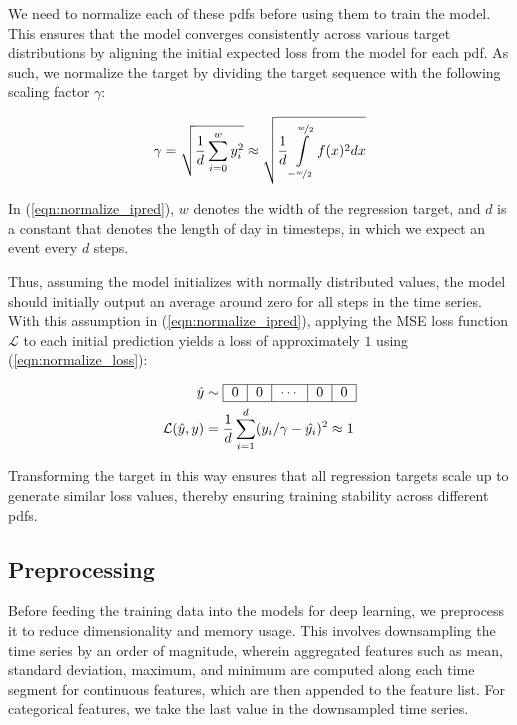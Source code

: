 \documentclass{article}
\begin{document}
We need to normalize each of these pdfs before using them to train the model. This ensures that the model converges consistently across various target distributions by aligning the initial expected loss from the model for each pdf. As such, we normalize the target by dividing the target sequence with the following scaling factor $\gamma$:

\begin{align} \label{eqn:normalize}
\displaystyle \gamma = \sqrt{\dfrac{1}{d}\sum\limits_{i=0}^{w} y_i^2} \approx \sqrt{\dfrac{1}{d}\int\limits_{-\nicefrac{w}{2}}^{\nicefrac{w}{2}} f(x)^2 dx}
\end{align}

In (\ref{eqn:normalize_ipred}), $w$ denotes the width of the regression target, and $d$ is a constant that denotes the length of day in timesteps, in which we expect an event every $d$ steps. 

Thus, assuming the model initializes with normally distributed values, the model should initially output an average around zero for all steps in the time series. With this assumption in (\ref{eqn:normalize_ipred}), applying the MSE loss function $\mathcal{L}$ to each initial prediction yields a loss of approximately $1$ using (\ref{eqn:normalize_loss}):

\begin{align} 
\hat{y} &\sim \begin{tabular}{|c|c|c|c|c|}
    \hline
    $0$ & $0$ & $\cdots$ & $0$ & $0$\\
    \hline
\end{tabular} \label{eqn:normalize_ipred} \\
\displaystyle \mathcal{L}(\hat{y},y) &= \dfrac{1}{d}\sum_{i=1}^{d}(y_i/\gamma - \hat{y_i})^2 \approx 1 \label{eqn:normalize_loss}
\end{align}

Transforming the target in this way ensures that all regression targets scale up to generate similar loss values, thereby ensuring training stability across different pdfs.

\subsection{Preprocessing}

Before feeding the training data into the models for deep learning, we preprocess it to reduce dimensionality and memory usage. This involves downsampling the time series by an order of magnitude, wherein aggregated features such as mean, standard deviation, maximum, and minimum are computed along each time segment for continuous features, which are then appended to the feature list. For categorical features, we take the last value in the downsampled time series.
\end{document}
